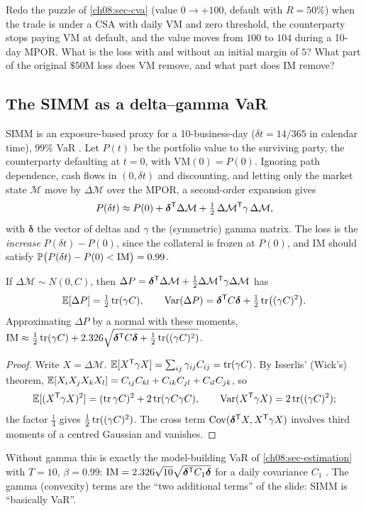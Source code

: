 \begin{paracol}{2}
\begin{exercise}
Redo the puzzle of \cref{ch08:sec-cva} (value $0\to+100$, default with $R=50\%$) when the trade is under a CSA with
daily VM and zero threshold, the counterparty stops paying VM at default, and the value moves from $100$ to $104$
during a 10-day MPOR. What is the loss with and without an initial margin of $5$? What part of the original $\$50$M
loss does VM remove, and what part does IM remove?
\end{exercise}

\subsection{The SIMM as a delta--gamma VaR}
SIMM is an exposure-based proxy for a 10-business-day ($\delta t=14/365$ in calendar time), $99\%$ VaR
. Let $P(t)$ be the portfolio value to the surviving party, the counterparty defaulting at $t=0$,
with $\mathrm{VM}(0)=P(0)$. Ignoring path dependence, cash flows in $(0,\delta t)$ and discounting, and letting only
the market state $\mathcal M$ move by $\Delta\mathcal M$ over the MPOR, a second-order expansion gives
\[
  P(\delta t)\approx P(0)+\bm\delta^{\mathsf T}\Delta\mathcal M+\tfrac12\,\Delta\mathcal M^{\mathsf T}\gamma\,\Delta\mathcal M ,
\]
with $\bm\delta$ the vector of deltas and $\gamma$ the (symmetric) gamma matrix. The loss is the \emph{increase}
$P(\delta t)-P(0)$, since the collateral is frozen at $P(0)$, and IM should satisfy
$\mathbb{P}\bigl(P(\delta t)-P(0)<\mathrm{IM}\bigr)=0.99$.

\begin{proposition}\label{ch08:prop-simm}
If $\Delta\mathcal M\sim N(0,C)$, then $\Delta P=\bm\delta^{\mathsf T}\Delta\mathcal M+\frac12\Delta\mathcal M^{\mathsf T}\gamma\Delta\mathcal M$ has
\[
  \mathbb{E}[\Delta P]=\tfrac12\operatorname{tr}(\gamma C),\qquad \operatorname{Var}(\Delta P)=\bm\delta^{\mathsf T} C\bm\delta+\tfrac12\operatorname{tr}\bigl((\gamma C)^2\bigr).
\]
Approximating $\Delta P$ by a normal with these moments,
$\mathrm{IM}\approx\frac12\operatorname{tr}(\gamma C)+2.326\sqrt{\bm\delta^{\mathsf T} C\bm\delta+\frac12\operatorname{tr}((\gamma C)^2)}$.
\end{proposition}
\begin{proof}
Write $X=\Delta\mathcal M$. $\mathbb{E}[X^{\mathsf T}\gamma X]=\sum_{ij}\gamma_{ij}C_{ij}=\operatorname{tr}(\gamma C)$. By Isserlis' (Wick's) theorem,
$\mathbb{E}[X_iX_jX_kX_l]=C_{ij}C_{kl}+C_{ik}C_{jl}+C_{il}C_{jk}$, so
\[\mathbb{E}[(X^{\mathsf T}\gamma X)^2]=(\operatorname{tr}\gamma C)^2+2\operatorname{tr}(\gamma C\gamma C),\qquad \operatorname{Var}(X^{\mathsf T}\gamma X)=2\operatorname{tr}((\gamma C)^2);\]
the factor
$\frac14$ gives $\frac12\operatorname{tr}((\gamma C)^2)$. The cross term $\operatorname{Cov}(\bm\delta^{\mathsf T} X,X^{\mathsf T}\gamma X)$ involves third moments of a
centred Gaussian and vanishes.
\end{proof}
Without gamma this is exactly the model-building VaR of \cref{ch08:sec-estimation} with $T=10$, $\beta=0.99$:
$\mathrm{IM}=2.326\sqrt{10}\sqrt{\bm\delta^{\mathsf T} C_1\bm\delta}$ for a daily covariance $C_1$ . The
gamma (convexity) terms are the ``two additional terms'' of the slide: SIMM is ``basically VaR''.


\end{paracol}
